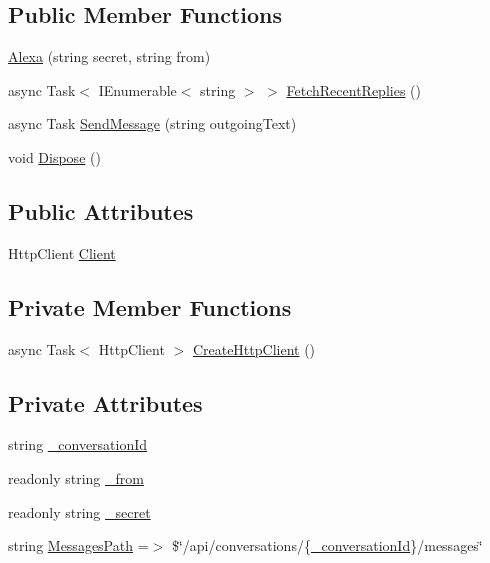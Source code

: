 \subsection*{Public Member Functions}
\begin{DoxyCompactItemize}
\item 
\hyperlink{class_wcf_service1_1_1_alexa_a4d589d523e0b283f94c1e2507ef4700f}{Alexa} (string secret, string from)
\item 
async Task$<$ I\+Enumerable$<$ string $>$ $>$ \hyperlink{class_wcf_service1_1_1_alexa_a6222dd6b2c2bc8da8ece2321ad2090ed}{Fetch\+Recent\+Replies} ()
\item 
async Task \hyperlink{class_wcf_service1_1_1_alexa_a6d8d3cc497642584fa380f1cbf053f66}{Send\+Message} (string outgoing\+Text)
\item 
void \hyperlink{class_wcf_service1_1_1_alexa_a7dfa3adcc0c14cf1863daafac2ff5c37}{Dispose} ()
\end{DoxyCompactItemize}
\subsection*{Public Attributes}
\begin{DoxyCompactItemize}
\item 
Http\+Client \hyperlink{class_wcf_service1_1_1_alexa_a62b57286b8d06d2328d1c160bd80f7c5}{Client}
\end{DoxyCompactItemize}
\subsection*{Private Member Functions}
\begin{DoxyCompactItemize}
\item 
async Task$<$ Http\+Client $>$ \hyperlink{class_wcf_service1_1_1_alexa_a2e9aee5a18c8690845046d1da09e60b2}{Create\+Http\+Client} ()
\end{DoxyCompactItemize}
\subsection*{Private Attributes}
\begin{DoxyCompactItemize}
\item 
string \hyperlink{class_wcf_service1_1_1_alexa_abe74124f288adbe9661da5a83ae0051c}{\+\_\+conversation\+Id}
\item 
readonly string \hyperlink{class_wcf_service1_1_1_alexa_a1c94ae34da8665a0918b04cbdfe7707e}{\+\_\+from}
\item 
readonly string \hyperlink{class_wcf_service1_1_1_alexa_a7619c280d871d3abd9db45e733ffaaa5}{\+\_\+secret}
\item 
string \hyperlink{class_wcf_service1_1_1_alexa_a7c8ee921966bce4aa52953d9a148e69b}{Messages\+Path} =$>$ \$\char`\"{}/api/conversations/\{\hyperlink{class_wcf_service1_1_1_alexa_abe74124f288adbe9661da5a83ae0051c}{\+\_\+conversation\+Id}\}/messages\char`\"{}
\end{DoxyCompactItemize}


